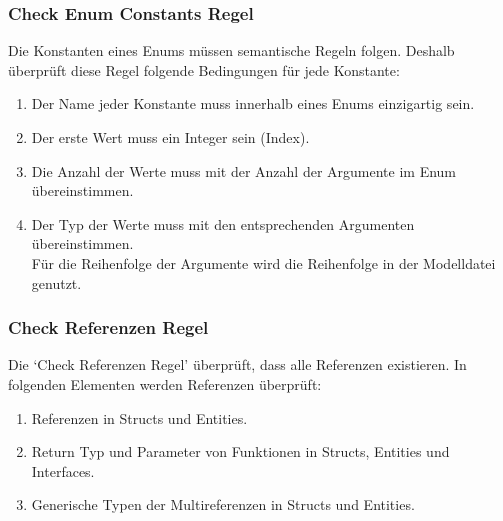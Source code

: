 \documentclass[./einleitung.tex]{subfiles}
\begin{document}
    \subsubsection{Check Enum Constants Regel}
    Die Konstanten eines Enums müssen semantische Regeln folgen.
    Deshalb überprüft diese Regel folgende Bedingungen für jede Konstante:
    \begin{enumerate}
        \item Der Name jeder Konstante muss innerhalb eines Enums einzigartig sein.
        \item Der erste Wert muss ein Integer sein (Index).
        \item Die Anzahl der Werte muss mit der Anzahl der Argumente im Enum übereinstimmen.
        \item Der Typ der Werte muss mit den entsprechenden Argumenten übereinstimmen. \\
        Für die Reihenfolge der Argumente wird die Reihenfolge in der Modelldatei genutzt.
    \end{enumerate}

    \subsubsection{Check Referenzen Regel}
    Die `Check Referenzen Regel' überprüft, dass alle Referenzen existieren.
    In folgenden Elementen werden Referenzen überprüft:
    \begin{enumerate}
        \item Referenzen in Structs und Entities.
        \item Return Typ und Parameter von Funktionen in Structs, Entities und Interfaces.
        \item Generische Typen der Multireferenzen in Structs und Entities.
    \end{enumerate}
\end{document}
